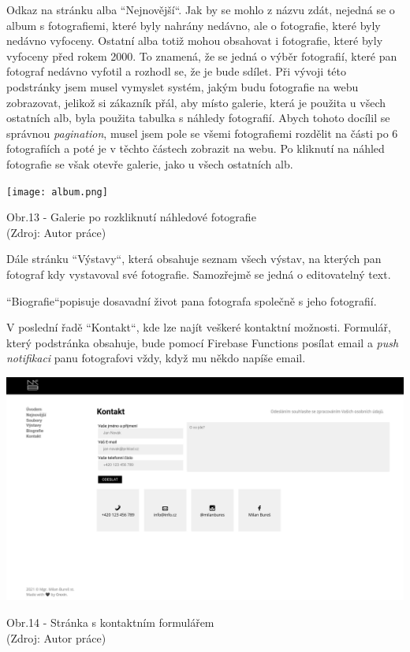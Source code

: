 \documentclass[12pt,a4paper]{report}
\begin{document}
  Odkaz na stránku alba ``Nejnovější``. 
  Jak by se mohlo z názvu zdát, nejedná se o album s fotografiemi, které byly nahrány nedávno, ale 
  o fotografie, které byly nedávno vyfoceny. Ostatní alba totiž mohou obsahovat i fotografie, které byly
  vyfoceny před rokem 2000. To znamená, že se
  jedná o výběr fotografií, které pan fotograf nedávno vyfotil a rozhodl se, že je bude sdílet. Při
  vývoji této podstránky jsem musel vymyslet systém, jakým budu fotografie na webu zobrazovat,
  jelikož si zákazník přál, aby místo galerie, která je použita u všech ostatních alb, byla použita
  tabulka s náhledy fotografií. Abych tohoto docílil se správnou \emph{pagination}, musel jsem pole
  se všemi fotografiemi rozdělit na části po 6 fotografiích a poté je v těchto částech zobrazit na
  webu. Po kliknutí na náhled fotografie se však otevře galerie, jako u všech ostatních alb.
  
  \vspace*{0.5cm}
  \noindent\texttt{[image: album.png]}
  \begin{center}
    Obr.13 - Galerie po rozkliknutí náhledové fotografie  \\
    (Zdroj: Autor práce)
  \end{center}
  \vspace*{0.5cm}
 
  Dále stránku ``Výstavy``, která obsahuje seznam všech výstav, na kterých pan fotograf kdy vystavoval
  své fotografie. Samozřejmě se jedná o editovatelný text.
  
  ``Biografie``\space popisuje dosavadní život pana fotografa společně s jeho fotografií.
  
  V poslední řadě ``Kontakt``, kde lze najít veškeré kontaktní možnosti. Formulář, který podstránka
  obsahuje, bude pomocí Firebase Functions posílat email a \emph{push notifikaci} panu fotografovi vždy,
  když mu někdo napíše email.

  \vspace*{0.5cm}
  \noindent\includegraphics[width=\linewidth]{contact.png}
  \begin{center}
    Obr.14 -  Stránka s kontaktním formulářem \\
    (Zdroj: Autor práce)
  \end{center}
  \vspace*{0.5cm}
\end{document}
